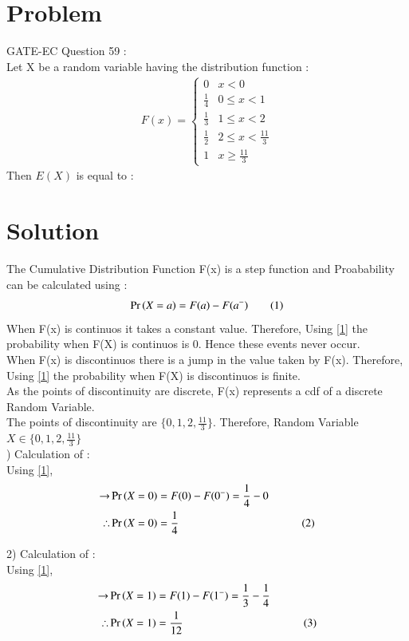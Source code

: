 \documentclass[journal,12pt,twocolumn]{IEEEtran}
\begin{document}
\section*{\textbf{Problem}}
GATE-EC Question 59 : \\
Let X be a random variable having the distribution function :
\begin{align*}
F(x)=   
\begin{cases}
0 & x<0 \\
\frac{1}{4} & 0\le x<1 \\
\frac{1}{3} & 1\le x<2 \\
\frac{1}{2} & 2\le x<\frac{11}{3} \\
1 & x\ge\frac{11}{3}
\end{cases}
\end{align*}
Then $E(X)$ is equal to :

\section*{\textbf{Solution}}
\textrightarrow The Cumulative Distribution Function F(x) is a step function and Proabability can be calculated using :
\begin{align*}
\Pr\left(X=a\right)=F(a)-F(a^-) \tag{1} \label{1}
\end{align*}
\textrightarrow When F(x) is continuos it takes a constant value. Therefore, Using \eqref{1} the probability when F(X) is continuos is 0. Hence these events never occur. \\[1mm]
\textrightarrow When F(x) is discontinuos there is a jump in the value taken by F(x). Therefore, Using \eqref{1} the probability when F(X) is discontinuos is finite. \\[1mm]
\textrightarrow As the points of discontinuity are discrete, F(x) represents a cdf of a discrete Random Variable. \\[1mm]
\textrightarrow The points of discontinuity are $\{0, 1, 2, \frac{11}{3}\}$. Therefore, Random Variable $X\in \{0, 1, 2, \frac{11}{3}\}$ \\
\vfill{}) Calculation of : \\[2mm]
Using \eqref{1},
\begin{align*}
\rightarrow &\Pr\left(X=0\right)=F(0)-F(0^-)=\frac{1}{4}-0& \\
\therefore &\Pr\left(X=0\right)=\frac{1}{4}& \tag{2} \label{2} 
\end{align*}

2) Calculation of : \\[2mm]
Using \eqref{1},
\begin{align*}
\rightarrow &\Pr\left(X=1\right)=F(1)-F(1^-)=\frac{1}{3}-\frac{1}{4}& \\
\therefore &\Pr\left(X=1\right)=\frac{1}{12}& \tag{3} \label{3} 
\end{align*}
\end{document}
